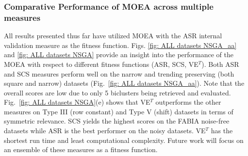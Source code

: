\subsubsection{Comparative Performance of MOEA across multiple measures}
All results presented thus far have utilized MOEA with the ASR internal validation measure as the fitness function. 
Figs. \ref{fig: ALL datasets NSGA_aa} and \ref{fig: ALL datasets NSGA} provide an insight into the performance of the MOEA with respect to different fitness functions (ASR, SCS, VE$^T$). Both ASR and SCS measures perform well on the narrow and trending preserving (both square and narrow) datasets (Fig.~\ref{fig: ALL datasets NSGA_aa}). Note that the overall scores are low due to only 5 biclusters being retrieved and evaluated. 
Fig.~\ref{fig: ALL datasets NSGA}(e) shows that VE$^T$ outperforms the other measures on Type III (row constant) and Type V (shift) datasets in terms of symmetric relevance. SCS yields the highest scores on the FABIA noise-free datasets while ASR is the best performer on the noisy datasets. VE$^T$ has the shortest run time and least computational complexity.  Future work will focus on an ensemble of these measures as a fitness function. 





%


